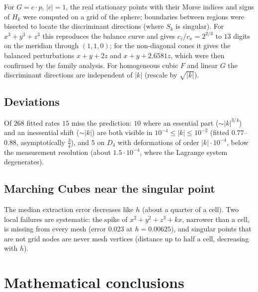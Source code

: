 \documentclass[11pt, a4paper]{article}
\theoremstyle{plain}
\theoremstyle{definition}
\theoremstyle{remark}
\theoremstyle{definition}
\begin{document}
For $G=c\cdot p$, $|c|=1$, the real stationary points with their Morse indices and
signs of $H_k$ were computed on a grid of the sphere; boundaries between regions
were bisected to locate the discriminant directions (where $S_k$ is singular).
For $x^3+y^3+z^3$ this reproduces the balance curve and gives $c_z/c_x=2^{2/3}$ to
$13$ digits on the meridian through $(1,1,0)$; for the non-diagonal cones it gives
the balanced perturbations $x+y+2z$ and $x+y+2.6581z$, which were then confirmed by
the family analysis. For homogeneous cubic $F$ and linear $G$ the discriminant
directions are independent of $|k|$ (rescale by $\sqrt{|k|}$).

\subsection{Deviations}

Of $268$ fitted rates $15$ miss the prediction: $10$ where an essential part
($\sim|k|^{3/4}$) and an inessential shift ($\sim|k|$) are both visible in
$10^{-4}\le|k|\le10^{-2}$ (fitted $0.77$--$0.88$, asymptotically $\tfrac34$), and $5$
on $D_4$ with deformations of order $|k|\cdot10^{-4}$, below the measurement
resolution (about $1.5\cdot10^{-4}$, where the Lagrange system degenerates).

\subsection{Marching Cubes near the singular point}

The median extraction error decreases like $h$ (about a quarter of a cell).
Two local failures are systematic: the spike of $x^2+y^2+z^3+kx$, narrower than a
cell, is missing from every mesh (error $0.023$ at $h=0.00625$), and singular points
that are not grid nodes are never mesh vertices (distance up to half a cell,
decreasing with $h$).

\section{Mathematical conclusions}
\end{document}
